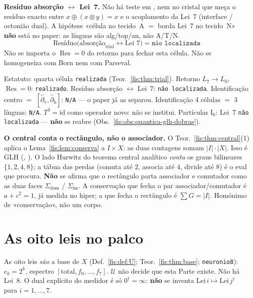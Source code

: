 \documentclass[livro.tex]{subfiles}
\begin{document}
\begin{observacao}
\medskip\noindent\textbf{Resíduo absorção \(\leftrightarrow\)
Lei~7.}
Não há teste em ,
 nem no cristal
que meça o resíduo exacto entre
\(x\oplus(x\otimes y)=x\)
e o acoplamento da Lei~7
(interface / octonião dual).
A hipótese «célula no tecido~A $=$
borda Lei~7 no tecido~N» \textbf{não}
está no paper: as línguas são
alg/top/an, não A/T/N.
\[
\boxed{\;
\text{Resíduo}\bigl(
\text{absorção}_{\mathrm{trial}}
\leftrightarrow
\text{Lei~7}
\bigr)
=\texttt{não localizada}
\;}
\]
Não se importa o \(\operatorname{Res}=0\)
do retorno para fechar esta célula.
Não se homogeneíza com Born nem com
Parseval.

\medskip\noindent Estatuto:
quarta célula
\texttt{realizada}
(Teor.~\ref{fis:thm:trial}).
Retorno \(L_7\to L_0\),
\(\operatorname{Res}=0\):
\texttt{realizado}.
Resíduo absorção \(\leftrightarrow\) Lei~7:
\texttt{não localizada}.
Identificação centro \(=\)
\([\hat\partial_{\mathrm{v}},\hat\partial_{\mathrm{h}}]\):
\texttt{N/A}
--- o paper já as separou.
Identificação 4 células \(=\) 3 línguas:
\texttt{N/A}.
\(T^{3}=\mathrm{id}\) como operador novo:
não se institui.
Partículas \(\mathrm{I}_{6}\): Lei~7
\texttt{não localizada} ---
\textbf{não} se reabre
(Obs.~\ref{fis:obs:quantica-glh-dobras}).
\end{observacao}

\medskip\noindent\textbf{O central conta o rectângulo, não o
associador.} O Teor.~\ref{fis:thm:central}(1) aplica o
Lema~\ref{fis:lem:conserva} a \(I\times X\): as duas contagens
somam \(\lvert I\rvert\cdot\lvert X\rvert\). Isso é GLH
(, ). O lado Hurwitz
do teorema central analítico \emph{conta} os graus bilineares
\(\{1,2,4,8\}\); a tábua das perdas (comuta até \(2\), associa até
\(4\), divide até \(8\)) é o eval que  procura.
\textbf{Não} se afirma que o rectângulo parta associador e
comutador como as duas faces \(\Sigma_{\mathrm{dom}}\) /
\(\Sigma_{\mathrm{im}}\). A conservação que fecha o par
associador/comutador é \(a+c^{2}=1\), já medida no hiper; a que
fecha o rectângulo é \(\sum G=\lvert I\rvert\). Homónimo de
«conservação», não um corpo.

\section{As oito leis no palco}\label{fis:quantica-oito-leis}

\noindent As oito leis \emph{são} a base de \(X\)
(Def.~\ref{fis:def:U}; Teor.~\ref{fis:thm:base};
 \texttt{neuronio8}):
\(e_k=2^{k}\), espectro \([\mathrm{total},f_0,\ldots,f_7]\).
\(\mathcal{U}\) não decide que esta Parte existe. Não há Lei~8.
O dual explícito do medidor é só \(0^{\dagger}=\infty\):
\textbf{não} se inventa \(\mathrm{Lei}\,i\mapsto\mathrm{Lei}\,j^{\dagger}\)
para \(i=1,\ldots,7\).
\end{document}
